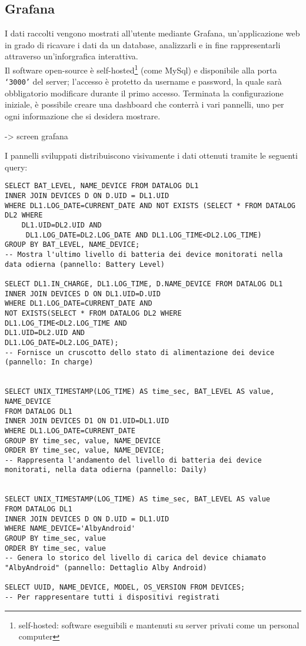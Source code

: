 \documentclass[target=bach]{thud}
\begin{document}
            \subsection{Grafana}

                    I dati raccolti vengono mostrati all'utente mediante Grafana, un'applicazione web in grado di ricavare i dati da un database, analizzarli e in fine rappresentarli attraverso un'inforgrafica interattiva.\\
                    Il software open-source è self-hosted\footnote[1]{self-hosted: software eseguibili e mantenuti su server privati come un personal computer} (come MySql) e disponibile alla porta \texttt{`3000'} del server; l'accesso è protetto da username e password, la quale sarà obbligatorio modificare durante il primo accesso.
                    Terminata la configurazione iniziale, è possibile creare una dashboard che conterrà i vari pannelli, uno per ogni informazione che si desidera mostrare.


                    -> screen grafana

                    I pannelli sviluppati distribuiscono visivamente i dati ottenuti tramite le seguenti query:
\begin{lstlisting}
SELECT BAT_LEVEL, NAME_DEVICE FROM DATALOG DL1
INNER JOIN DEVICES D ON D.UID = DL1.UID
WHERE DL1.LOG_DATE=CURRENT_DATE AND NOT EXISTS (SELECT * FROM DATALOG DL2 WHERE
    DL1.UID=DL2.UID AND
     DL1.LOG_DATE=DL2.LOG_DATE AND DL1.LOG_TIME<DL2.LOG_TIME)
GROUP BY BAT_LEVEL, NAME_DEVICE;
-- Mostra l'ultimo livello di batteria dei device monitorati nella data odierna (pannello: Battery Level)

SELECT DL1.IN_CHARGE, DL1.LOG_TIME, D.NAME_DEVICE FROM DATALOG DL1
INNER JOIN DEVICES D ON DL1.UID=D.UID
WHERE DL1.LOG_DATE=CURRENT_DATE AND
NOT EXISTS(SELECT * FROM DATALOG DL2 WHERE
DL1.LOG_TIME<DL2.LOG_TIME AND
DL1.UID=DL2.UID AND
DL1.LOG_DATE=DL2.LOG_DATE);
-- Fornisce un cruscotto dello stato di alimentazione dei device (pannello: In charge)


SELECT UNIX_TIMESTAMP(LOG_TIME) AS time_sec, BAT_LEVEL AS value, NAME_DEVICE
FROM DATALOG DL1
INNER JOIN DEVICES D1 ON D1.UID=DL1.UID
WHERE DL1.LOG_DATE=CURRENT_DATE
GROUP BY time_sec, value, NAME_DEVICE
ORDER BY time_sec, value, NAME_DEVICE;
-- Rappresenta l'andamento del livello di batteria dei device monitorati, nella data odierna (pannello: Daily)


SELECT UNIX_TIMESTAMP(LOG_TIME) AS time_sec, BAT_LEVEL AS value
FROM DATALOG DL1
INNER JOIN DEVICES D ON D.UID = DL1.UID
WHERE NAME_DEVICE='AlbyAndroid'
GROUP BY time_sec, value
ORDER BY time_sec, value
-- Genera lo storico del livello di carica del device chiamato "AlbyAndroid" (pannello: Dettaglio Alby Android)

SELECT UUID, NAME_DEVICE, MODEL, OS_VERSION FROM DEVICES;
-- Per rappresentare tutti i dispositivi registrati

\end{lstlisting}
\end{document}

